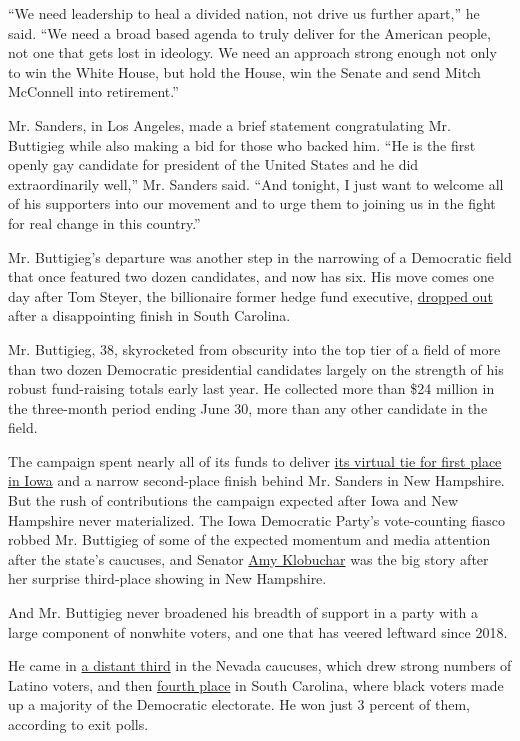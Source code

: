 ``We need leadership to heal a divided nation, not drive us further
apart,'' he said. ``We need a broad based agenda to truly deliver for
the American people, not one that gets lost in ideology. We need an
approach strong enough not only to win the White House, but hold the
House, win the Senate and send Mitch McConnell into retirement.''

Mr. Sanders, in Los Angeles, made a brief statement congratulating Mr.
Buttigieg while also making a bid for those who backed him. ``He is the
first openly gay candidate for president of the United States and he did
extraordinarily well,'' Mr. Sanders said. ``And tonight, I just want to
welcome all of his supporters into our movement and to urge them to
joining us in the fight for real change in this country.''

Mr. Buttigieg's departure was another step in the narrowing of a
Democratic field that once featured two dozen candidates, and now has
six. His move comes one day after Tom Steyer, the billionaire former
hedge fund executive,
\href{https://www.nytimes3xbfgragh.onion/2020/02/29/us/politics/tom-steyer-drops-out.html}{dropped
out} after a disappointing finish in South Carolina.

Mr. Buttigieg, 38, skyrocketed from obscurity into the top tier of a
field of more than two dozen Democratic presidential candidates largely
on the strength of his robust fund-raising totals early last year. He
collected more than \$24 million in the three-month period ending June
30, more than any other candidate in the field.

The campaign spent nearly all of its funds to deliver
\href{https://www.nytimes3xbfgragh.onion/interactive/2020/02/04/us/elections/results-iowa-caucus.html}{its
virtual tie for first place in Iowa} and a narrow second-place finish
behind Mr. Sanders in New Hampshire. But the rush of contributions the
campaign expected after Iowa and New Hampshire never materialized. The
Iowa Democratic Party's vote-counting fiasco robbed Mr. Buttigieg of
some of the expected momentum and media attention after the state's
caucuses, and Senator
\href{https://www.nytimes3xbfgragh.onion/interactive/2020/us/elections/amy-klobuchar.html}{Amy
Klobuchar} was the big story after her surprise third-place showing in
New Hampshire.

And Mr. Buttigieg never broadened his breadth of support in a party with
a large component of nonwhite voters, and one that has veered leftward
since 2018.

He came in
\href{https://www.nytimes3xbfgragh.onion/interactive/2020/02/22/us/elections/results-nevada-caucus.html}{a
distant third} in the Nevada caucuses, which drew strong numbers of
Latino voters, and then
\href{https://www.nytimes3xbfgragh.onion/interactive/2020/02/29/us/elections/results-south-carolina-primary-election.html}{fourth
place} in South Carolina, where black voters made up a majority of the
Democratic electorate. He won just 3 percent of them, according to exit
polls.

